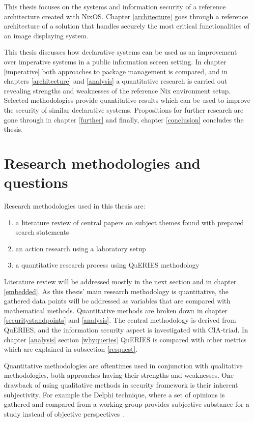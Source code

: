This thesis focuses on the systems and information security of a
reference architecture created with NixOS. Chapter \ref{architecture}
goes through a reference architecture of a solution that handles
securely the most critical functionalities of an image displaying system.

This thesis discusses how declarative systems can be used as an
improvement over imperative systems in a public information screen
setting. In chapter \ref{imperative} both approaches to package
management is compared, and in chapters \ref{architecture} and
\ref{analysis} a quantitative research is carried out revealing
strengths and weaknesses of the reference Nix environment
setup. Selected methodologies provide quantitative results which can
be used to improve the security of similar declarative
systems. Propositions for further research are gone through in chapter
\ref{further} and finally, chapter \ref{conclusion} concludes the
thesis.

\section{Research methodologies and questions}

Research methodologies used in this thesis are:
\begin{enumerate}
\item a literature review of central papers on subject themes found
  with prepared search statements
\item an action research using a laboratory setup
\item a quantitative research process using QuERIES methodology
\end{enumerate}

Literature review will be addressed mostly in the next section and in chapter
\ref{embedded}. As this
thesis' main research methodology is quantitative, the gathered data
points will be addressed as variables that are compared with
mathematical methods. Quantitative methods are broken down in chapter
\ref{securitystandpoints} and \ref{analysis}. The central methodology
is derived from QuERIES, and the information security aspect is
investigated with CIA-triad. In chapter \ref{analysis} section
\ref{whyqueries} QuERIES is compared with other metrics which are
explained in subsection \ref{resquest}.

Quantitative methodologies are oftentimes used in conjunction with
qualitative methodologies, both approaches having their strengths and
weaknesses. One drawback of using qualitative methods in security
framework is their inherent subjectivity. For example the Delphi
technique, where a set of opinions is gathered and compared from a
working group provides subjective substance for a study instead of
objective perspectives \cite{wang2005information}.

